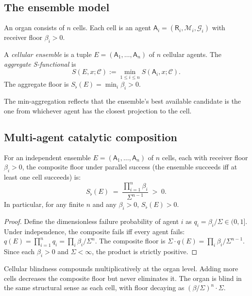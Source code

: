 \documentclass[twocolumn,11pt,a4paper]{article}
\newcommand{\Sfloor}{S_{\flat}}
\newcommand{\agent}{\mathsf{A}}
\newcommand{\receiver}{\mathsf{R}}
\newcommand{\Cell}{\mathcal{C}}
\begin{document}
\subsection{The ensemble model}

An organ consists of $n$ cells. Each cell is an agent
$\agent_i = (\receiver_i, \mathcal{M}_i, \mathcal{G}_i)$ with receiver floor
$\beta_i > 0$.

\begin{definition}\label{def:ensemble}
A \emph{cellular ensemble} is a tuple $E = (\agent_1,\dots,\agent_n)$ of
$n$ cellular agents. The \emph{aggregate S-functional} is
\[
S(E, x; \Cell) := \min_{1 \leq i \leq n} S(\agent_i, x; \Cell).
\]
The aggregate floor is $\Sfloor(E) = \min_i \beta_i > 0$.
\end{definition}

\begin{remark}\label{rem:min-aggregate}
The min-aggregation reflects that the ensemble's best available candidate
is the one from whichever agent has the closest projection to the cell.
\end{remark}

\subsection{Multi-agent catalytic composition}

\begin{theorem}\label{thm:group-blindness}
For an independent ensemble $E = (\agent_1,\dots,\agent_n)$ of $n$ cells,
each with receiver floor $\beta_i > 0$, the composite floor under
parallel success (the ensemble succeeds iff at least one cell succeeds) is:
\[
\Sfloor(E) \;=\; \frac{\prod_{i=1}^n \beta_i}{\Sigma^{n-1}} \;>\; 0.
\]
In particular, for any finite $n$ and any $\beta_i > 0$,
$\Sfloor(E) > 0$.
\end{theorem}

\begin{proof}
Define the dimensionless failure probability of agent $i$ as
$q_i = \beta_i/\Sigma \in (0,1]$. Under independence, the composite
fails iff every agent fails:
$q(E) = \prod_{i=1}^n q_i = \prod_i \beta_i/\Sigma^n$.
The composite floor is $\Sigma \cdot q(E) = \prod_i \beta_i / \Sigma^{n-1}$.
Since each $\beta_i > 0$ and $\Sigma < \infty$, the product is strictly
positive.
\end{proof}

\begin{corollary}\label{cor:multiplicative}
Cellular blindness compounds multiplicatively at the organ level.
Adding more cells decreases the composite floor but never eliminates it.
The organ is blind in the same structural sense as each cell,
with floor decaying as $(\beta/\Sigma)^n \cdot \Sigma$.
\end{corollary}
\end{document}

